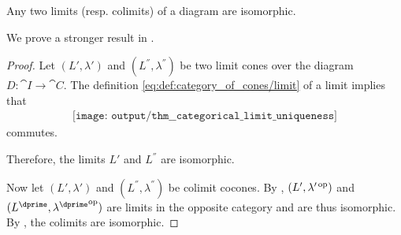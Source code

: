 \begin{lemma}\label{thm:categorical_limit_uniqueness_lemma}
  Any two limits (resp. colimits) of a diagram are isomorphic.

  We prove a stronger result in .
\end{lemma}
\begin{proof}
  Let \( (L', \lambda') \) and \( (L^\dprime, \lambda^\dprime) \) be two limit cones over the diagram \( D: \cat{I} \to \cat{C} \). The definition \eqref{eq:def:category_of_cones/limit} of a limit implies that
  \begin{equation}\label{eq:thm:categorical_limit_uniqueness}
    \begin{aligned}
      \texttt{[image: output/thm\_\_categorical\_limit\_uniqueness]}
    \end{aligned}
  \end{equation}
  commutes.

  Therefore, the limits \( L' \) and \( L^\dprime \) are isomorphic.

  Now let \( (L', \lambda') \) and \( (L^\dprime, \lambda^\dprime) \) be colimit cocones. By , \( (L', \lambda'^{\operatorname{op}}) \) and \( (L^\dprime, {\lambda^\dprime}^{\opcat}) \) are limits in the opposite category and are thus isomorphic. By , the colimits are isomorphic.
\end{proof}


